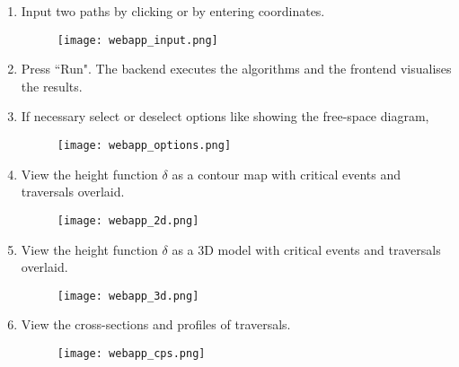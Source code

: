 \begin{enumerate}
	\item Input two paths by clicking or by entering coordinates.
	
	\begin{figure}[H]
		\centering
		\texttt{[image: webapp\_input.png]}
	\end{figure}
	
	\item Press ``Run". The backend executes the algorithms and the frontend visualises the results.

	\item If necessary select or deselect options like showing the free-space diagram, 
	
	\begin{figure}[H]
		\centering
		\texttt{[image: webapp\_options.png]}
	\end{figure}
	
	\item View the height function $\delta$ as a contour map with critical events and traversals overlaid.
	
	
	\begin{figure}[H]
		\centering
		\texttt{[image: webapp\_2d.png]}
	\end{figure}
	
	\item View the height function $\delta$ as a 3D model with critical events and traversals overlaid.
	
	\begin{figure}[H]
		\centering
		\texttt{[image: webapp\_3d.png]}
	\end{figure}
	
	\item View the cross-sections and profiles of traversals.
	
	\begin{figure}[H]
		\centering
		\texttt{[image: webapp\_cps.png]}
	\end{figure}
	
	
	
\end{enumerate}


